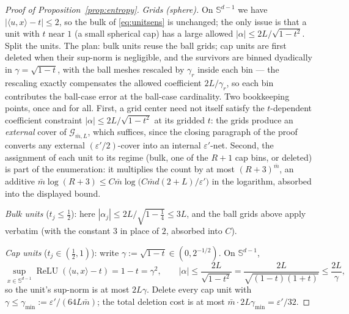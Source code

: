 \documentclass[11pt,reqno]{amsart}
\theoremstyle{plain}
\theoremstyle{definition}
\theoremstyle{remark}
\newcommand{\Sd}{\mathbb{S}^{d-1}}
\newcommand{\eps}{\varepsilon}
\newcommand{\relu}{\operatorname{ReLU}}
\newcommand{\GG}{\mathcal{G}}
\newcommand{\inn}[2]{\langle #1,#2\rangle}
\begin{document}
\begin{proof}[Proof of Proposition~\textup{\ref{prop:entropy}}]
\emph{Grids (sphere).} On $\Sd$ we have $|\inn u x-t|\le2$, so the bulk of \eqref{eq:unitsens} is unchanged; the only issue is that a unit with $t$ near $1$ (a small spherical cap) has a large allowed $|\alpha|\le2L/\sqrt{1-t^2}$. Split the units. The plan: bulk units reuse the ball grids; cap units are first deleted when their sup-norm is negligible, and the survivors are binned dyadically in $\gamma=\sqrt{1-t}$, with the ball meshes rescaled by $\gamma_r$ inside each bin --- the rescaling exactly compensates the allowed coefficient $2L/\gamma_r$, so each bin contributes the ball-case error at the ball-case cardinality. Two bookkeeping points, once and for all. First, a grid center need not itself satisfy the $t$-dependent coefficient constraint $|\alpha|\le2L/\sqrt{1-t^2}$ at its gridded $t$: the grids produce an \emph{external} cover of $\GG_{\bar m,L}$, which suffices, since the closing paragraph of the proof converts any external $(\eps'/2)$-cover into an internal $\eps'$-net. Second, the assignment of each unit to its regime (bulk, one of the $R+1$ cap bins, or deleted) is part of the enumeration: it multiplies the count by at most $(R+3)^{\bar m}$, an additive $\bar m\log(R+3)\le C\bar m\log\bigl(C\bar md(2+L)/\eps'\bigr)$ in the logarithm, absorbed into the displayed bound.

\emph{Bulk units} ($t_j\le\tfrac12$): here $|\alpha_j|\le2L/\sqrt{1-\tfrac14}\le3L$, and the ball grids above apply verbatim (with the constant $3$ in place of $2$, absorbed into $C$).

\emph{Cap units} ($t_j\in(\tfrac12,1)$): write $\gamma:=\sqrt{1-t}\in(0,2^{-1/2})$. On $\Sd$,
\[
\sup_{x\in\Sd}\relu(\inn u x-t)=1-t=\gamma^2,\qquad |\alpha|\le\frac{2L}{\sqrt{1-t^2}}=\frac{2L}{\sqrt{(1-t)(1+t)}}\le\frac{2L}{\gamma},
\]
so the unit's sup-norm is at most $2L\gamma$. Delete every cap unit with $\gamma\le\gamma_{\min}:=\eps'/(64L\bar m)$; the total deletion cost is at most $\bar m\cdot2L\gamma_{\min}=\eps'/32$.


\end{proof}
\end{document}
